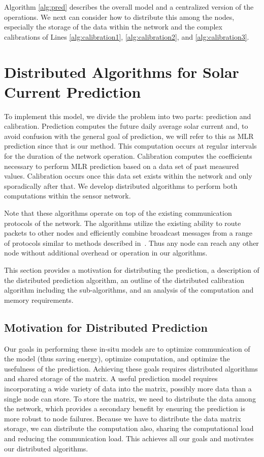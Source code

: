 \documentclass[prodmode,acmtosn]{acmsmall}
\begin{document}
Algorithm \ref{alg:pred} describes the overall model and a centralized version of the operations.
We next can consider how to distribute this among the nodes, especially the storage of the data within the network and the complex calibrations of Lines \ref{alg:calibration1}, \ref{alg:calibration2}, and \ref{alg:calibration3}.

\section{Distributed Algorithms for Solar Current Prediction} \label{sec:solar-algs}
To implement this model, we divide the problem into two parts: prediction and calibration.
Prediction computes the future daily average solar current and, to avoid confusion with the general goal of prediction, we will refer to this as MLR prediction since that is our method.
This computation occurs at regular intervals for the duration of the network operation.
Calibration computes the coefficients necessary to perform MLR prediction based on a data set of past measured values.
Calibration occurs once this data set exists within the network and only sporadically after that.
We develop distributed algorithms to perform both computations within the sensor network.

Note that these algorithms operate on top of the existing communication protocols of the network.
The algorithms utilize the existing ability to route packets to other nodes and efficiently combine broadcast messages from a range of protocols similar to methods described in~\cite{HansenIPSN2011}.
Thus any node can reach any other node without additional overhead or operation in our algorithms.

This section provides a motivation for distributing the prediction, a description of the distributed prediction algorithm, an outline of the distributed calibration algorithm including the sub-algorithms, and an analysis of the computation and memory requirements.

\subsection{Motivation for Distributed Prediction}
Our goals in performing these in-situ models are to optimize communication of the model (thus saving energy), optimize computation, and optimize the usefulness of the prediction.
Achieving these goals requires distributed algorithms and shared storage of the matrix.
A useful prediction model requires incorporating a wide variety of data into the matrix, possibly more data than a single node can store.
To store the matrix, we need to distribute the data among the network, which provides a secondary benefit by ensuring the prediction is more robust to node failures.
Because we have to distribute the data matrix storage, we can distribute the computation also, sharing the computational load and reducing the communication load.
This achieves all our goals and motivates our distributed algorithms.
\end{document}
